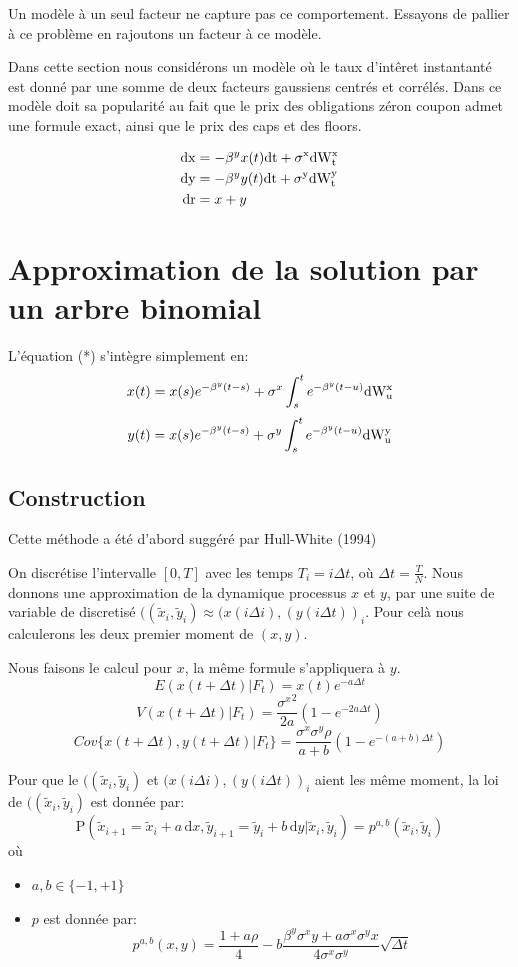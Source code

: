 Un modèle à un seul facteur ne capture pas ce comportement. Essayons de pallier à ce problème en rajoutons un facteur à ce modèle.

Dans cette section nous considérons un modèle où le taux d'intêret instantanté est donné par une somme de deux facteurs gaussiens centrés et corrélés. Dans ce modèle doit sa popularité au fait que le prix des obligations zéron coupon admet une formule exact, ainsi que le prix des caps et des floors.


\begin{align*}
  \rm{d}x &= -\beta^y x(t) \rm{d}t + \sigma^x \rm{d}W^x_t \\
  \rm{d}y &= -\beta^y y(t) \rm{d}t + \sigma^y \rm{d}W^y_t \\
  \rm{d}r &= x + y
\end{align*}


\section{Approximation de la solution par un arbre binomial}


L'équation (*) s'intègre simplement en:
$$x(t) = x(s) e^{-\beta^y (t-s)} +  \sigma^x \int_s^t e^{- \beta^y (t-u)} \rm{d} W^x_u $$
$$y(t) = x(s) e^{-\beta^y (t-s)} +  \sigma^y \int_s^t e^{- \beta^y (t-u)} \rm{d} W^y_u $$

\subsection*{Construction}

Cette méthode a été d'abord suggéré par Hull-White (1994)

On discrétise l’intervalle $[0, T]$ avec les temps $T_i = i \Delta t$, où $\Delta t = \frac{T}{N}$.
Nous donnons une approximation de la dynamique processus $x$ et $y$, par une suite de variable de discretisé $((\widetilde{x}_i, \widetilde{y}_i) \approx (x(i \Delta i), (y(i \Delta t))_i $. Pour celà nous calculerons les deux premier moment de $(x, y)$.

Nous faisons le calcul pour $x$, la même formule s'appliquera à $y$.
$$E(x(t+\Delta t) | F_t) = x(t) e^{-a \Delta t}$$
$$V(x(t+\Delta t) | F_t) = \frac{{\sigma^x}^2}{2a} (1 - e^{-2a \Delta t})$$
$$Cov\{x(t+\Delta t), y(t+\Delta t) | F_t \} = \frac{\sigma^x \sigma^y \rho}{a + b} (1-e^{-(a+b)\Delta t})$$

Pour que le $((\widetilde{x}_i, \widetilde{y}_i)$ et $(x(i \Delta i), (y(i \Delta t))_i $ aient les même moment, la loi de  $((\widetilde{x}_i, \widetilde{y}_i)$  est donnée par:
$$\mathrm{P} \left( \widetilde{x}_{i+1} = \widetilde{x}_i + a \, \mathrm{d}x, \widetilde{y}_{i+1} = \widetilde{y}_i + b \, \mathrm{d}y |  \widetilde{x}_i, \widetilde{y}_i \right) = p^{a, b}( \widetilde{x}_i, \widetilde{y}_i)$$
où 
\begin{itemize}
\item $a, b \in \{-1, +1\}$
\item $p$ est donnée par:
$$ p^{a, b}(x, y) = \frac{1 + a \rho}{4} - b \frac{\beta^y \sigma^x y + a \sigma^x \sigma^y  x}{4 \sigma^x \sigma^y} \sqrt{\Delta t} $$
\end{itemize}

